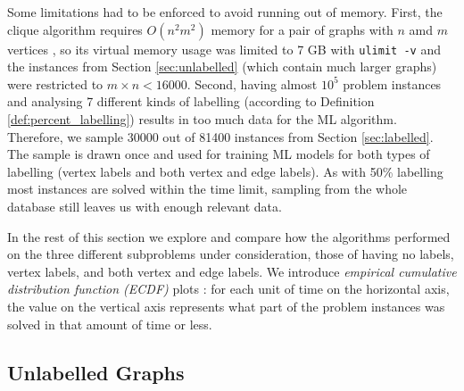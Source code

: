 \documentclass{l4proj}
\theoremstyle{definition}
\theoremstyle{remark}
\begin{document}
Some limitations had to be enforced to avoid running out of memory. First, the
clique algorithm requires $O(n^2m^2)$ memory for a pair of graphs with $n$ amd
$m$ vertices \cite{DBLP:conf/aaai/HoffmannMR17, DBLP:conf/cp/McCreeshNPS16}, so
its virtual memory usage was limited to 7 GB with \texttt{ulimit -v} and the
instances from Section \ref{sec:unlabelled} (which contain much larger graphs)
were restricted to $m \times n < \num{16000}$. Second, having almost $10^5$
problem instances and analysing 7 different kinds of labelling (according to
Definition \ref{def:percent_labelling}) results in too much data for the ML
algorithm. Therefore, we sample \num{30000} out of \num{81400} instances from
Section \ref{sec:labelled}. The sample is drawn once and used for training ML
models for both types of labelling (vertex labels and both vertex and edge
labels). As with 50\% labelling most instances are solved within the time limit,
sampling from the whole database still leaves us with enough relevant data.

In the rest of this section we explore and compare how the algorithms performed
on the three different subproblems under consideration, those of having no
labels, vertex labels, and both vertex and edge labels. We introduce
\emph{empirical cumulative distribution function (ECDF)}
plots \cite{10.2307/2334448}: for each unit of time on the horizontal axis, the
value on the vertical axis represents what part of the problem instances was
solved in that amount of time or less.

\subsection{Unlabelled Graphs}
\end{document}
